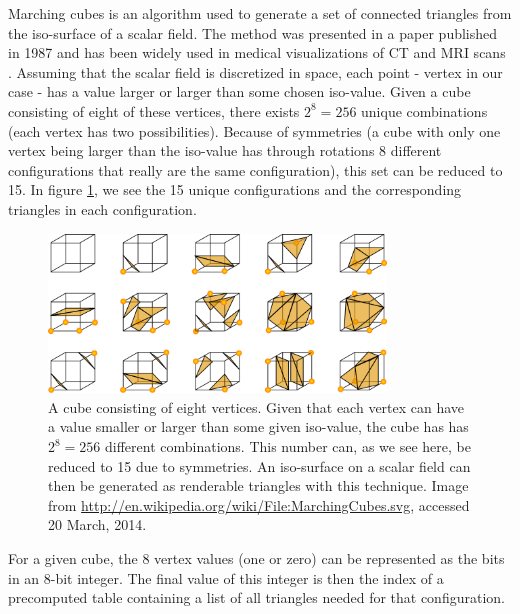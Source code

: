 Marching cubes is an algorithm used to generate a set of connected triangles from the iso-surface of a scalar field. The method was presented in a paper published in 1987 and has been widely used in medical visualizations of CT and MRI scans \cite{wiki:marching_cubes}. Assuming that the scalar field is discretized in space, each point - vertex in our case - has a value larger or larger than some chosen iso-value. Given a cube consisting of eight of these vertices, there exists $2^{8}=256$ unique combinations (each vertex has two possibilities). Because of symmetries (a cube with only one vertex being larger than the iso-value has through rotations 8 different configurations that really are the same configuration), this set can be reduced to 15. In figure \ref{fig:vis_marching_cubes}, we see the 15 unique configurations and the corresponding triangles in each configuration.
\begin{figure}[htb]
\begin{center}
\includegraphics[width=0.8\textwidth, trim=0cm 0cm 0cm 0cm, clip]{visualization/figures/marching_cubes.png}
\end{center}
\caption{A cube consisting of eight vertices. Given that each vertex can have a value smaller or larger than some given iso-value, the cube has has $2^8=256$ different combinations. This number can, as we see here, be reduced to 15 due to symmetries. An iso-surface on a scalar field can then be generated as renderable triangles with this technique. Image from \url{http://en.wikipedia.org/wiki/File:MarchingCubes.svg}, accessed 20 March, 2014.}
\label{fig:vis_marching_cubes}
\end{figure}
For a given cube, the 8 vertex values (one or zero) can be represented as the bits in an 8-bit integer. The final value of this integer is then the index of a precomputed table containing a list of all triangles needed for that configuration.

